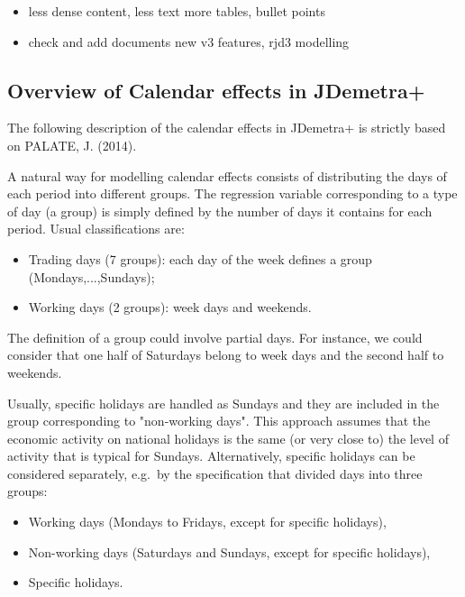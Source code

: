 \documentclass[
  letterpaper,
  DIV=11,
  numbers=noendperiod]{scrreprt}
\providecommand{\tightlist}{%
  \setlength{\itemsep}{0pt}\setlength{\parskip}{0pt}}\usepackage{longtable,booktabs,array}
\begin{document}
\begin{itemize}
\tightlist
\item
  less dense content, less text more tables, bullet points
\item
  check and add documents new v3 features, rjd3 modelling
\end{itemize}

\hypertarget{overview-of-calendar-effects-in-jdemetra}{%
\subsection{Overview of Calendar effects in
JDemetra+}\label{overview-of-calendar-effects-in-jdemetra}}

The following description of the calendar effects in JDemetra+ is
strictly based on PALATE, J. (2014).

A natural way for modelling calendar effects consists of distributing
the days of each period into different groups. The regression variable
corresponding to a type of day (a group) is simply defined by the number
of days it contains for each period. Usual classifications are:

\begin{itemize}
\item
  Trading days (7 groups): each day of the week defines a group
  (Mondays,...,Sundays);
\item
  Working days (2 groups): week days and weekends.
\end{itemize}

The definition of a group could involve partial days. For instance, we
could consider that one half of Saturdays belong to week days and the
second half to weekends.

Usually, specific holidays are handled as Sundays and they are included
in the group corresponding to "non-working days". This approach assumes
that the economic activity on national holidays is the same (or very
close to) the level of activity that is typical for Sundays.
Alternatively, specific holidays can be considered separately, e.g.~by
the specification that divided days into three groups:

\begin{itemize}
\item
  Working days (Mondays to Fridays, except for specific holidays),
\item
  Non-working days (Saturdays and Sundays, except for specific
  holidays),
\item
  Specific holidays.
\end{itemize}
\end{document}
